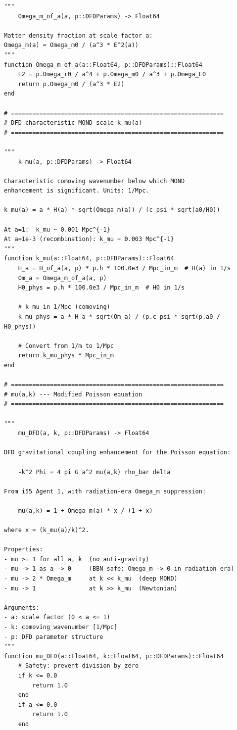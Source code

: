\documentclass[11pt,a4paper]{article}
\begin{document}
\begin{lstlisting}[caption={DFDGravity.jl --- Core $\mu(a,k)$ and $\Sigma(a,k)$ module},label=lst:dfdgravity]
"""
    Omega_m_of_a(a, p::DFDParams) -> Float64

Matter density fraction at scale factor a:
Omega_m(a) = Omega_m0 / (a^3 * E^2(a))
"""
function Omega_m_of_a(a::Float64, p::DFDParams)::Float64
    E2 = p.Omega_r0 / a^4 + p.Omega_m0 / a^3 + p.Omega_L0
    return p.Omega_m0 / (a^3 * E2)
end

# ============================================================
# DFD characteristic MOND scale k_mu(a)
# ============================================================

"""
    k_mu(a, p::DFDParams) -> Float64

Characteristic comoving wavenumber below which MOND
enhancement is significant. Units: 1/Mpc.

k_mu(a) = a * H(a) * sqrt(Omega_m(a)) / (c_psi * sqrt(a0/H0))

At a=1:  k_mu ~ 0.001 Mpc^{-1}
At a=1e-3 (recombination): k_mu ~ 0.003 Mpc^{-1}
"""
function k_mu(a::Float64, p::DFDParams)::Float64
    H_a = H_of_a(a, p) * p.h * 100.0e3 / Mpc_in_m  # H(a) in 1/s
    Om_a = Omega_m_of_a(a, p)
    H0_phys = p.h * 100.0e3 / Mpc_in_m  # H0 in 1/s

    # k_mu in 1/Mpc (comoving)
    k_mu_phys = a * H_a * sqrt(Om_a) / (p.c_psi * sqrt(p.a0 / H0_phys))

    # Convert from 1/m to 1/Mpc
    return k_mu_phys * Mpc_in_m
end

# ============================================================
# mu(a,k) --- Modified Poisson equation
# ============================================================

"""
    mu_DFD(a, k, p::DFDParams) -> Float64

DFD gravitational coupling enhancement for the Poisson equation:

    -k^2 Phi = 4 pi G a^2 mu(a,k) rho_bar delta

From i55 Agent 1, with radiation-era Omega_m suppression:

    mu(a,k) = 1 + Omega_m(a) * x / (1 + x)

where x = (k_mu(a)/k)^2.

Properties:
- mu >= 1 for all a, k  (no anti-gravity)
- mu -> 1 as a -> 0     (BBN safe: Omega_m -> 0 in radiation era)
- mu -> 2 * Omega_m     at k << k_mu  (deep MOND)
- mu -> 1               at k >> k_mu  (Newtonian)

Arguments:
- a: scale factor (0 < a <= 1)
- k: comoving wavenumber [1/Mpc]
- p: DFD parameter structure
"""
function mu_DFD(a::Float64, k::Float64, p::DFDParams)::Float64
    # Safety: prevent division by zero
    if k <= 0.0
        return 1.0
    end
    if a <= 0.0
        return 1.0
    end


\end{lstlisting}
\end{document}
